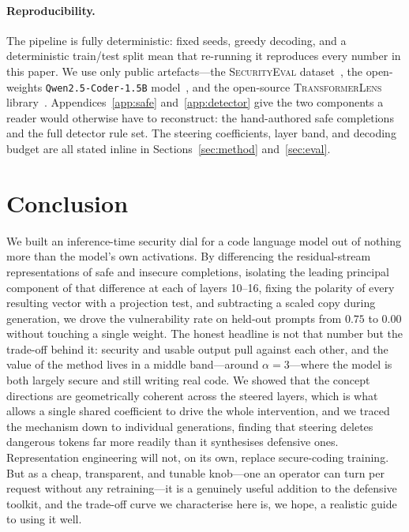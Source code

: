 \documentclass[11pt,a4paper]{article}
\begin{document}
\paragraph{Reproducibility.}
The pipeline is fully deterministic: fixed seeds, greedy decoding, and a deterministic train/test split mean that re-running it reproduces every number in this paper. We use only public artefacts---the \textsc{SecurityEval} dataset~\cite{siddiq2022securityeval}, the open-weights \texttt{Qwen2.5-Coder-1.5B} model~\cite{hui2024qwen25coder}, and the open-source \textsc{TransformerLens} library~\cite{nanda2022transformerlens}. Appendices~\ref{app:safe} and~\ref{app:detector} give the two components a reader would otherwise have to reconstruct: the hand-authored safe completions and the full detector rule set. The steering coefficients, layer band, and decoding budget are all stated inline in Sections~\ref{sec:method} and~\ref{sec:eval}.

\section{Conclusion}
\label{sec:conclusion}

We built an inference-time security dial for a code language model out of nothing more than the model's own activations. By differencing the residual-stream representations of safe and insecure completions, isolating the leading principal component of that difference at each of layers 10--16, fixing the polarity of every resulting vector with a projection test, and subtracting a scaled copy during generation, we drove the vulnerability rate on held-out prompts from $0.75$ to $0.00$ without touching a single weight. The honest headline is not that number but the trade-off behind it: security and usable output pull against each other, and the value of the method lives in a middle band---around $\alpha = 3$---where the model is both largely secure and still writing real code. We showed that the concept directions are geometrically coherent across the steered layers, which is what allows a single shared coefficient to drive the whole intervention, and we traced the mechanism down to individual generations, finding that steering deletes dangerous tokens far more readily than it synthesises defensive ones. Representation engineering will not, on its own, replace secure-coding training. But as a cheap, transparent, and tunable knob---one an operator can turn per request without any retraining---it is a genuinely useful addition to the defensive toolkit, and the trade-off curve we characterise here is, we hope, a realistic guide to using it well.
\end{document}
